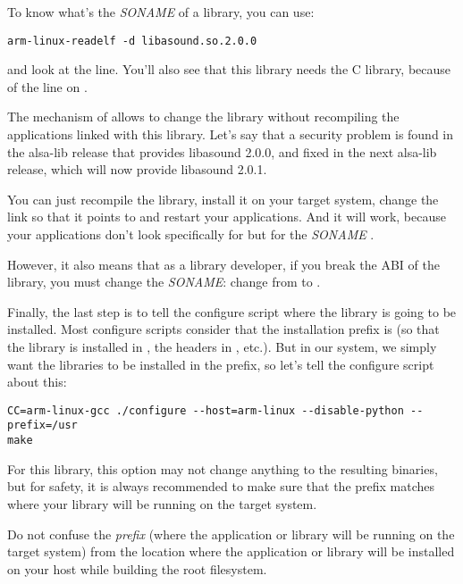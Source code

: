 To know what's the {\em SONAME} of a library, you can use:
\begin{verbatim}
arm-linux-readelf -d libasound.so.2.0.0
\end{verbatim}

and look at the  line. You'll also see that this
library needs the C library, because of the  line on
.

The mechanism of  allows to change the library without
recompiling the applications linked with this library. Let's say that
a security problem is found in the alsa-lib release that provides
libasound 2.0.0, and fixed in the next alsa-lib release, which will
now provide libasound 2.0.1.

You can just recompile the library, install it on your target system,
change the link  so that it points to
 and restart your applications. And it will
work, because your applications don't look specifically for
 but for the {\em SONAME}
.

However, it also means that as a library developer, if you break the
ABI of the library, you must change the {\em SONAME}: change from
 to .

Finally, the last step is to tell the configure script where the
library is going to be installed. Most configure scripts consider that
the installation prefix is  (so that the library is
installed in , the headers in
, etc.). But in our system, we simply want
the libraries to be installed in the  prefix, so let's tell
the configure script about this:

\begin{verbatim}
CC=arm-linux-gcc ./configure --host=arm-linux --disable-python --prefix=/usr
make
\end{verbatim}

For this library, this option may not change anything to the resulting
binaries, but for safety, it is always recommended to make sure that
the prefix matches where your library will be running on the target
system.

Do not confuse the {\em prefix} (where the application or library will
be running on the target system) from the location where the
application or library will be installed on your host while building
the root filesystem.

